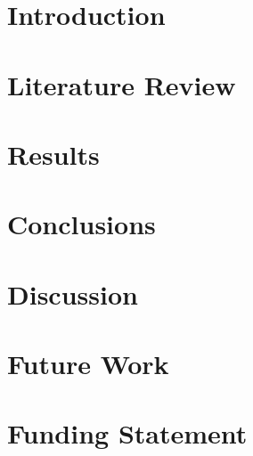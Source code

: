 \documentclass[fleqn]{cas-sc}
\begin{document}
\maketitle


\section{Introduction}\label{What does the label do?}

\begin{comment}
	Notes from 5/16/22 meeting with Dr. Jin:
		I Motivation - Good, needs more material
		II Analyze Difficulty in Solving Problem
		III ML/Data Analysis
			Tradeoffs
			Limits of Methods
		IV Plan
		
		Mention overlaps with other work
\end{comment}







\section{Literature Review}




\section{Results}

\section{Conclusions}

\section{Discussion}

\section{Future Work}

\section*{Funding Statement}
\end{document}
